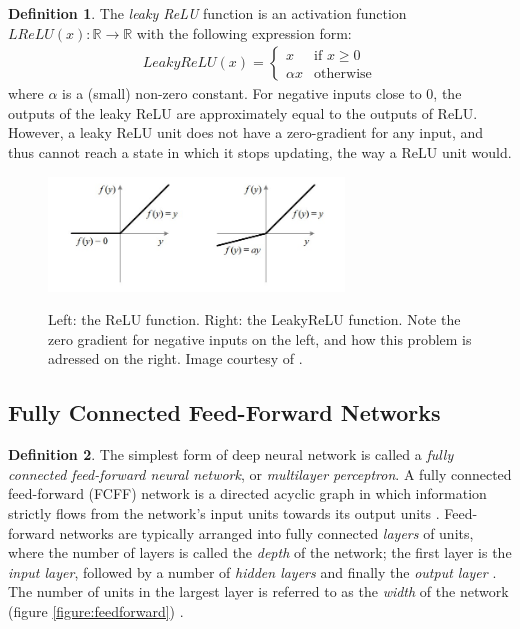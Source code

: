 \documentclass[12pt, titlepage]{report}
\theoremstyle{definition}
\newtheorem{definition}{Definition}
\begin{document}
\begin{definition}
The \emph{leaky ReLU} function is an activation function $LReLU(x) : \mathbb{R} \rightarrow \mathbb{R}$ with the following expression form:
\begin{gather}\label{eq:leakyrelu}
LeakyReLU(x) = 
\begin{cases}
    x 							 & \text{if } x\geq 0\\
    \alpha{x}             & \text{otherwise}
\end{cases}
\end{gather}
where $\alpha$ is a (small) non-zero constant. For negative inputs close to 0, the outputs of the leaky ReLU are approximately equal to the outputs of ReLU. However, a leaky ReLU unit does not have a zero-gradient for any input, and thus cannot reach a state in which it stops updating, the way a ReLU unit would\cite[Neural Networks Part 1: Setting up the Architecture]{karpathy2017cs231n}.
\end{definition}

\begin{figure}
\centering
\includegraphics[width=0.7\textwidth]{img/relu.jpg}\\
\caption{Left: the ReLU function. Right: the LeakyReLU function. Note the zero gradient for negative inputs on the left, and how this problem is adressed on the right. Image courtesy of \cite{sharma2017activation}.}
\label{figure:relu}
\end{figure}



\subsection{Fully Connected Feed-Forward Networks}
\begin{definition}
The simplest form of deep neural network is called a \emph{fully connected feed-forward neural network}, or \emph{multilayer perceptron}. A fully connected feed-forward (FCFF) network is a directed acyclic graph in which information strictly flows from the network's input units towards its output units \cite[p. 164]{goodfellow2016deep}. Feed-forward networks are typically arranged into fully connected \emph{layers} of units, where the number of layers is called the \emph{depth} of the network; the first layer is the \emph{input layer}, followed by a number of \emph{hidden layers} and finally the \emph{output layer} \cite[p. 164-165]{goodfellow2016deep}. The number of units in the largest layer is referred to as the \emph{width} of the network (figure \ref{figure:feedforward}) \cite[p. 164-165]{goodfellow2016deep}.
\end{definition}
\end{document}
